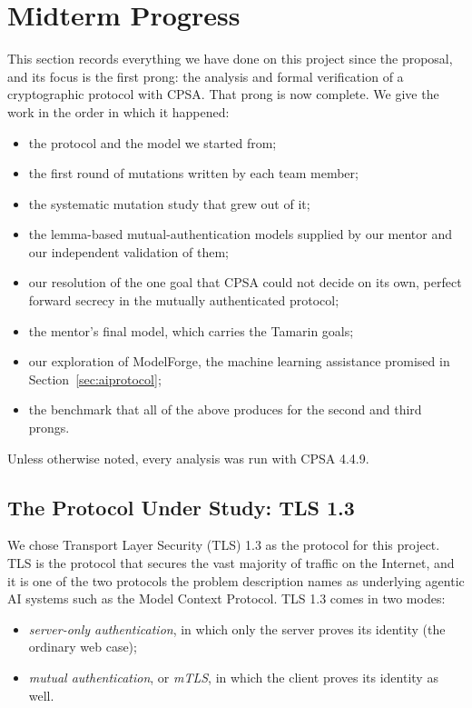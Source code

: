 \documentclass[11pt]{article}
\begin{document}
\section{Midterm Progress}
\label{sec:midterm}
This section records everything we have done on this project since the proposal, and its focus is the first prong: the analysis and formal verification of a cryptographic protocol with CPSA. That prong is now complete. We give the work in the order in which it happened:
\begin{itemize}
    \item the protocol and the model we started from;
    \item the first round of mutations written by each team member;
    \item the systematic mutation study that grew out of it;
    \item the lemma-based mutual-authentication models supplied by our mentor and our independent validation of them;
    \item our resolution of the one goal that CPSA could not decide on its own, perfect forward secrecy in the mutually authenticated protocol;
    \item the mentor's final model, which carries the Tamarin goals;
    \item our exploration of ModelForge, the machine learning assistance promised in Section~\ref{sec:aiprotocol};
    \item the benchmark that all of the above produces for the second and third prongs.
\end{itemize}
Unless otherwise noted, every analysis was run with CPSA 4.4.9.

\subsection{The Protocol Under Study: TLS 1.3}
\label{subsec:tls13}
We chose Transport Layer Security (TLS) 1.3 \cite{rfc8446} as the protocol for this project. TLS is the protocol that secures the vast majority of traffic on the Internet, and it is one of the two protocols the problem description names as underlying agentic AI systems such as the Model Context Protocol. TLS 1.3 comes in two modes:
\begin{itemize}
    \item \textit{server-only authentication}, in which only the server proves its identity (the ordinary web case);
    \item \textit{mutual authentication}, or \textit{mTLS}, in which the client proves its identity as well.
\end{itemize}
\end{document}
